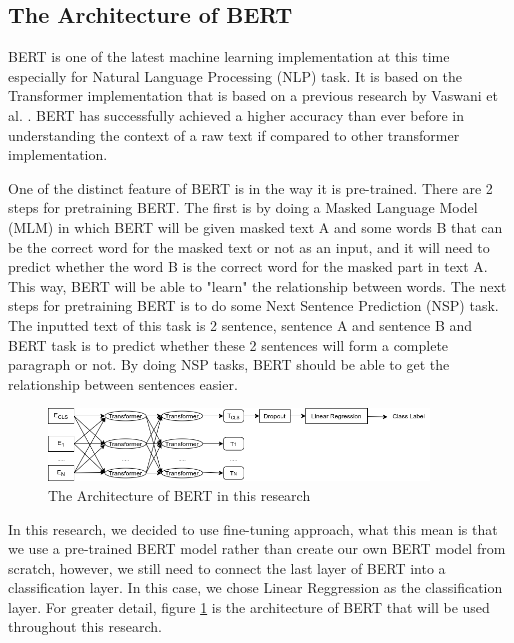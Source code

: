 \subsection{The Architecture of BERT}

BERT is one of the latest machine learning implementation at this time especially for Natural Language Processing (NLP) task. It is based on the Transformer implementation that is based on a previous research by Vaswani et al. \cite{attention_is_all_you_need}. BERT has successfully achieved a higher accuracy than ever before in understanding the context of a raw text if compared to other transformer implementation.

One of the distinct feature of BERT is in the way it is pre-trained. There are 2 steps for pretraining BERT. The first is by doing a Masked Language Model (MLM) in which BERT will be given masked text A and some words B that can be the correct word for the masked text or not as an input, and it will need to predict whether the word B is the correct word for the masked part in text A. This way, BERT will be able to "learn" the relationship between words. The next steps for pretraining BERT is to do some Next Sentence Prediction (NSP) task. The inputted text of this task is 2 sentence, sentence A and sentence B and BERT task is to predict whether these 2 sentences will form a complete paragraph or not. By doing NSP tasks, BERT should be able to get the relationship between sentences easier.

\begin{figure}[h!]
    \begin{center}
        \includegraphics[width= 0.9\textwidth]{gambar/bert_arch.png}
        \caption{The Architecture of BERT in this research}
        \label{fig: bert_arch}
    \end{center}
\end{figure}

In this research, we decided to use fine-tuning approach, what this mean is that we use a pre-trained BERT model rather than create our own BERT model from scratch, however, we still need to connect the last layer of BERT into a classification layer. In this case, we chose Linear Reggression as the classification layer. For greater detail, figure \ref{fig: bert_arch} is the architecture of BERT that will be used throughout this research.


